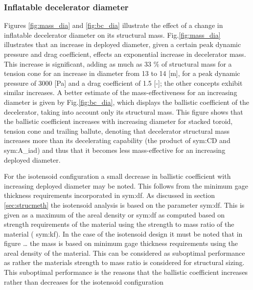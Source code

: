 \subsubsection{Inflatable decelerator diameter}
Figures \ref{fig:mass_dia} and \ref{fig:bc_dia} illustrate the effect of a change in inflatable decelerator diameter on its structural mass. Fig.\ref{fig:mass_dia} illustrates that an increase in deployed diameter, given a certain peak dynamic pressure and drag coefficient, effects an exponential increase in decelerator mass. This increase is significant, adding as much as 33 $\%$ of structural mass for a tension cone for an increase in diameter from 13 to 14 [m], for a peak dynamic pressure of 3000 [Pa] and a drag coefficient of 1.5 [-]; the other concepts exhibit similar increases. A better estimate of the mass-effectiveness for an increasing diameter is given by Fig.\ref{fig:bc_dia}, which displays the ballistic coefficient of the decelerator, taking into account only its structural mass. This figure shows that the ballistic coefficient increases with increasing diameter for stacked toroid, tension cone and trailing ballute, denoting that decelerator structural mass increases more than its decelerating capability (the product of \gls{sym:CD} and \gls{sym:A_iad}) and thus that it becomes less mass-effective for an increasing deployed diameter.

 For the isotensoid configuration a small decrease in ballistic coefficient with increasing deployed diameter may be noted. This follows from the minimum gage thickness requirements incorporated in \gls{sym:df}. As discussed in section \ref{sec:strucmeth} the isotensoid analysis is based on the parameter \gls{sym:df}. This is given as a maximum of the areal density or \gls{sym:df} as computed based on strength requirements of the material using the strength to mass ratio of the material ( \gls{sym:kf}). In the case of the isotensoid design it must be noted that in figure … the mass is based on minimum gage thickness requirements using the areal density of the material. This can be considered as suboptimal performance as rather the materials strength to mass ratio is considered for structural sizing. This suboptimal performance is the reasons that the ballistic coefficient increases rather than decreases for the isotensoid configuration



